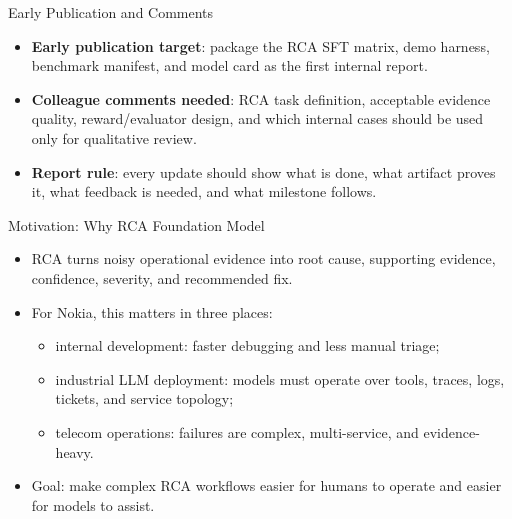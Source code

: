 \begin{frame}{Early Publication and Comments}
  \begin{itemize}
    \item \textbf{Early publication target}: package the RCA SFT matrix, demo
      harness, benchmark manifest, and model card as the first internal report.
    \item \textbf{Colleague comments needed}: RCA task definition, acceptable
      evidence quality, reward/evaluator design, and which internal cases should
      be used only for qualitative review.
    \item \textbf{Report rule}: every update should show what is done, what
      artifact proves it, what feedback is needed, and what milestone follows.
  \end{itemize}
\end{frame}

\begin{frame}{Motivation: Why RCA Foundation Model}
  \begin{itemize}
    \item RCA turns noisy operational evidence into root cause, supporting
      evidence, confidence, severity, and recommended fix.
    \item For Nokia, this matters in three places:
      \begin{itemize}
        \item internal development: faster debugging and less manual triage;
        \item industrial LLM deployment: models must operate over tools, traces,
          logs, tickets, and service topology;
        \item telecom operations: failures are complex, multi-service, and
          evidence-heavy.
      \end{itemize}
    \item Goal: make complex RCA workflows easier for humans to operate and
      easier for models to assist.
  \end{itemize}
\end{frame}

